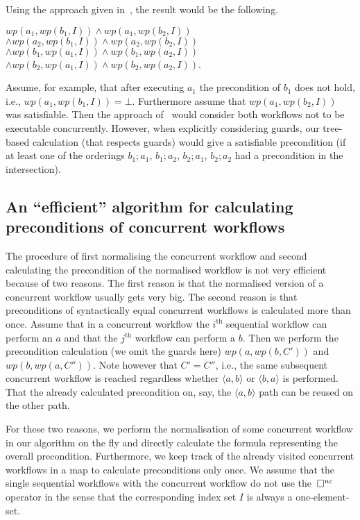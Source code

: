 \documentclass[11pt]{article}
\begin{document}
Using the approach given in~\cite{Wang2012}, the result would be the following.

\noindent
\hspace*{4pt} $wp(a_1,wp(b_1,I)) \land wp(a_1,wp(b_2,I))$ \\
$\land wp(a_2,wp(b_1,I)) \land wp(a_2,wp(b_2,I))$ \\
$\land wp(b_1,wp(a_1,I)) \land wp(b_1,wp(a_2,I))$ \\
$\land wp(b_2,wp(a_1,I)) \land wp(b_2,wp(a_2,I))$.

Assume, for example, that after executing $a_1$ the precondition of $b_1$ does not hold, i.e., $wp(a_1,wp(b_1,I)) = \bot$. Furthermore assume that $wp(a_1,wp(b_2,I))$ was satisfiable. Then the approach of~\cite{Wang2012} would consider both workflows not to be executable concurrently. However, when explicitly considering guards, our tree-based calculation (that respects guards) would give a satisfiable precondition (if at least one of the orderings $b_1 ; a_1$, $b_1 ; a_2$, $b_2 ; a_1$, $b_2 ; a_2$ had a precondition in the intersection).

\subsection{An ``efficient'' algorithm for calculating preconditions of concurrent workflows}

The procedure of first normalising the concurrent workflow and second calculating the precondition of the normalised workflow is not very efficient because of two reasons. The first reason is that the normalised version of a concurrent workflow usually gets very big. The second reason is that preconditions of syntactically equal concurrent workflows is calculated more than once. Assume that in a concurrent workflow the $i^\text{th}$ sequential workflow can perform an $a$ and that the $j^\text{th}$ workflow can perform a $b$. Then we perform the precondition calculation (we omit the guards here) $wp(a,wp(b,C'))$ and $wp(b,wp(a,C''))$. Note however that $C' = C''$, i.e., the same subsequent concurrent workflow is reached regardless whether $\langle a,b\rangle$ or $\langle b,a\rangle$ is performed. That the already calculated precondition on, say, the $\langle a,b\rangle$ path can be reused on the other path. 

For these two reasons, we perform the normalisation of some concurrent workflow in our algorithm on the fly and directly calculate the formula representing  the overall precondition. Furthermore, we keep track of the already visited concurrent workflows in a map to calculate preconditions only once. We assume that the single sequential workflows with the concurrent workflow do not use the $\, \Box^{nc}$ operator in the sense that the corresponding index set $I$ is always a one-element-set.
\end{document}
